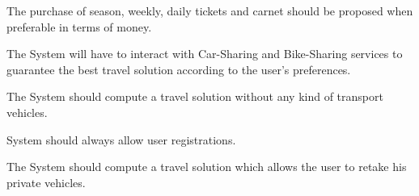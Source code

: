 \begin{goalList}
\begin{enumerate}[label={[}G 5.\arabic*{]}]
\item \label{goal:purchase} The purchase of season, weekly, daily tickets and carnet should be proposed when preferable in terms of money.  

\end{enumerate}

\item \label{goal:sharing}The System will have to interact with Car-Sharing and Bike-Sharing services to guarantee the best travel solution according to the user's preferences.

\item \label{goal:piotti}The System should compute a travel solution without any kind of transport vehicles.

\item \label{goal:login} System should always allow user registrations.

\item \label{goal:retakeCar}The System should compute a travel solution which allows the user to retake his private vehicles.

\end{goalList}


